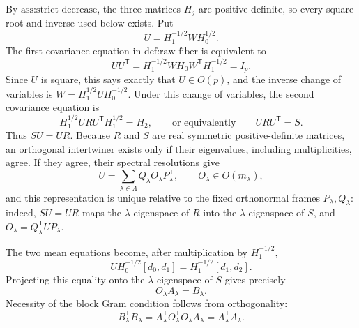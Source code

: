By \(\text{ass:strict-decrease}\), the three matrices \(H_j\) are positive definite, so every square root and inverse used below exists.  Put
\[
 U=H_1^{-1/2}WH_0^{1/2}.
\]
The first covariance equation in \(\text{def:raw-fiber}\) is equivalent to
\[
 UU^{\mathsf T}
 =H_1^{-1/2}WH_0W^{\mathsf T}H_1^{-1/2}=I_p.
\]
Since \(U\) is square, this says exactly that \(U\in O(p)\), and the inverse change of variables is \(W=H_1^{1/2}UH_0^{-1/2}\).  Under this change of variables, the second covariance equation is
\[
 H_1^{1/2}URU^{\mathsf T}H_1^{1/2}=H_2,
 \qquad\text{or equivalently}\qquad URU^{\mathsf T}=S.
\]
Thus \(SU=UR\).  Because \(R\) and \(S\) are real symmetric positive-definite matrices, an orthogonal intertwiner exists only if their eigenvalues, including multiplicities, agree.  If they agree, their spectral resolutions give
\[
 U=\sum_{\lambda\in\Lambda}Q_\lambda O_\lambda P_\lambda^{\mathsf T},
 \qquad O_\lambda\in O(m_\lambda),
\]
and this representation is unique relative to the fixed orthonormal frames \(P_\lambda,Q_\lambda\): indeed, \(SU=UR\) maps the \(\lambda\)-eigenspace of \(R\) into the \(\lambda\)-eigenspace of \(S\), and \(O_\lambda=Q_\lambda^{\mathsf T}UP_\lambda\).

The two mean equations become, after multiplication by \(H_1^{-1/2}\),
\[
 U H_0^{-1/2}[d_0,d_1]=H_1^{-1/2}[d_1,d_2].
\]
Projecting this equality onto the \(\lambda\)-eigenspace of \(S\) gives precisely
\[
 O_\lambda A_\lambda=B_\lambda.
\]
Necessity of the block Gram condition follows from orthogonality:
\[
 B_\lambda^{\mathsf T}B_\lambda
 =A_\lambda^{\mathsf T}O_\lambda^{\mathsf T}O_\lambda A_\lambda
 =A_\lambda^{\mathsf T}A_\lambda.
\]

